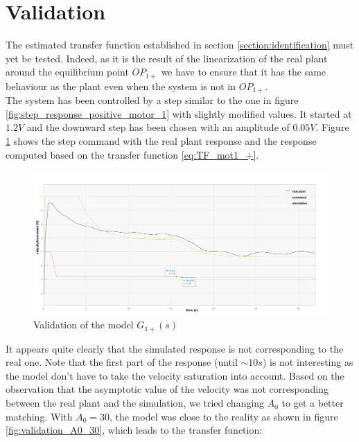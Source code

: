 \section{Validation}
\label{section_validation}

The estimated transfer function established in section \ref{section:identification} must yet be tested. Indeed, as it
is the result of the linearization of the real plant around the equilibrium point $OP_{1+}$ we have to ensure that it
has the same behaviour as the plant even when the system is not in $OP_{1+}$.\\

The system has been controlled by a step similar to the one in figure \ref{fig:step_response_positive_motor_1} with slightly
modified values. It started at $1.2 V$ and the downward step has been chosen with an amplitude of $0.05 V$. Figure 
\ref{fig:validation_A0_24} shows the step command with the real plant response and the response computed based on the
transfer function \ref{eq:TF_mot1_+}.

\begin{figure}[H]
    \centering
    \includegraphics[height=\textheight/3]{Pictures/validation_A0_24.png}
    \caption{Validation of the model $G_{1+} (s)$}
    \label{fig:validation_A0_24}
\end{figure}

It appears quite clearly that the simulated response is not corresponding to the real one. Note that the first part of
the response (until $\sim 10s$) is not interesting as the model don't have to take the velocity saturation into account.
Based on the observation that the asymptotic value of the velocity was not corresponding between the real plant and the
simulation, we tried changing $A_0$ to get a better matching. With $A_0 = 30$, the model was close to the reality as 
shown in figure \ref{fig:validation_A0_30}, which leads to the transfer function:

